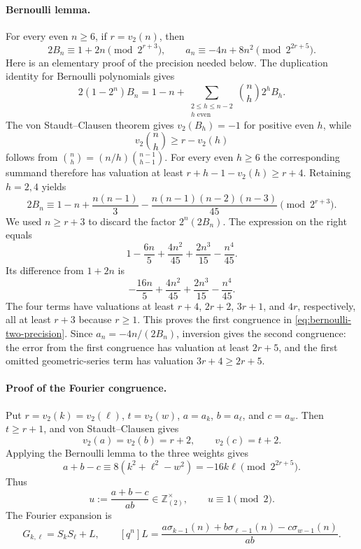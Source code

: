 \documentclass[11pt]{article}
\begin{document}
\paragraph{Bernoulli lemma.}
For every even $n\ge6$, if $r=v_2(n)$, then
\begin{equation}
 2B_n\equiv1+2n\pmod{2^{r+3}},\qquad
 a_n\equiv-4n+8n^2\pmod{2^{2r+5}}.
 \label{eq:bernoulli-two-precision}
\end{equation}
Here is an elementary proof of the precision needed below.  The
duplication identity for Bernoulli polynomials gives
\[
 2(1-2^n)B_n
 =1-n+\sum_{\substack{2\le h\le n-2\\h\text{ even}}}
       \binom nh2^hB_h.
\]
The von Staudt--Clausen theorem gives $v_2(B_h)=-1$ for positive even
$h$, while
\[
 v_2\binom nh\ge r-v_2(h)
\]
follows from $\binom nh=(n/h)\binom{n-1}{h-1}$.  For every even
$h\ge6$ the corresponding summand therefore has valuation at least
$r+h-1-v_2(h)\ge r+4$.  Retaining $h=2,4$ yields
\[
 2B_n\equiv
 1-n+\frac{n(n-1)}3
 -\frac{n(n-1)(n-2)(n-3)}{45}
 \pmod{2^{r+3}}.
\]
We used $n\ge r+3$ to discard the factor $2^n(2B_n)$.  The expression
on the right equals
\[
 1-\frac{6n}{5}+\frac{4n^2}{45}
       +\frac{2n^3}{15}-\frac{n^4}{45}.
\]
Its difference from $1+2n$ is
\[
 -\frac{16n}{5}+\frac{4n^2}{45}
       +\frac{2n^3}{15}-\frac{n^4}{45}.
\]
The four terms have valuations at least $r+4$, $2r+2$, $3r+1$, and
$4r$, respectively, all at least $r+3$ because $r\ge1$.  This proves
the first congruence in \eqref{eq:bernoulli-two-precision}.  Since
$a_n=-4n/(2B_n)$, inversion gives the second congruence: the error
from the first congruence has valuation at least $2r+5$, and the
first omitted geometric-series term has valuation $3r+4\ge2r+5$.

\paragraph{Proof of the Fourier congruence.}
Put $r=v_2(k)=v_2(\ell)$, $t=v_2(w)$,
$a=a_k$, $b=a_\ell$, and $c=a_w$.  Then $t\ge r+1$, and
von Staudt--Clausen gives
\[
 v_2(a)=v_2(b)=r+2,\qquad v_2(c)=t+2.
\]
Applying the Bernoulli lemma to the three weights gives
\[
 a+b-c\equiv
 8(k^2+\ell^2-w^2)=-16k\ell
 \pmod{2^{2r+5}}.
\]
Thus
\begin{equation}
 u:=\frac{a+b-c}{ab}\in\mathbb Z_{(2)}^\times,
 \qquad u\equiv1\pmod2.
 \label{eq:first-coeff-unit}
\end{equation}
The Fourier expansion is
\[
 G_{k,\ell}=S_kS_\ell+L,\qquad
 [q^n]L=
 \frac{a\sigma_{k-1}(n)+b\sigma_{\ell-1}(n)
                    -c\sigma_{w-1}(n)}{ab}.
\]
\end{document}
